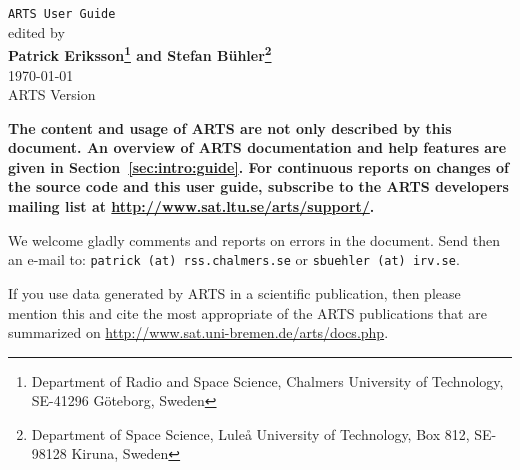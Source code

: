 





%
\renewcommand{\thepage}{title \arabic{page}} 

\thispagestyle{plain}
\begin{center}
  \vspace*{2cm}
  {\Huge \verb|ARTS User Guide|\\}
  \vspace*{1cm}
  {\large edited by \\}
  \vspace*{1cm}
  {\Large \bf Patrick Eriksson\footnote{
      Department of Radio and Space Science, 
      Chalmers University of Technology, SE-41296 G\"oteborg, Sweden} 
      and
    Stefan B\"uhler\footnote{
      Department of Space Science,
      Lule{\aa} University of Technology,
      Box 812, SE-98128 Kiruna, Sweden}  
    }\\
   \vspace*{2cm}
   {\large \today\\
    ARTS Version 
   }
\end{center}
\vspace*{4cm}
{\normalsize \bf
  \noindent
  The content and usage of ARTS are not only described by this
  document. An overview of ARTS documentation and help features are
  given in Section~\ref{sec:intro:guide}. For continuous reports on
  changes of the source code and this user guide, subscribe to the
  ARTS developers mailing list at \url{http://www.sat.ltu.se/arts/support/}.

  We welcome gladly comments and reports on errors in the document.
  Send then an e-mail to: \verb|patrick (at) rss.chalmers.se| or 
  \verb|sbuehler (at) irv.se|.

  If you use data generated by ARTS in a scientific
  publication, then please mention this and cite the most
  appropriate of the ARTS publications that are summarized on
  \url{http://www.sat.uni-bremen.de/arts/docs.php}.
}

